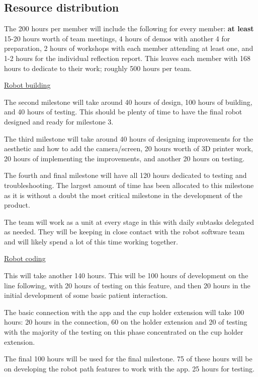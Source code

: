 \documentclass{article}
\begin{document}
\subsection{Resource distribution}

The 200 hours per member will include the following for every member: {\bf at least} 15-20 hours worth of team meetings, 4 hours of demos with another 4 for preparation, 2 hours of workshops with each member attending at least one, and 1-2 hours for the individual reflection report. This leaves each member with 168 hours to dedicate to their work; roughly 500 hours per team.


\underline{Robot building} 



The second milestone will take around 40 hours of design, 100 hours of building, and 40 hours of testing. This should be plenty of time to have the final robot designed and ready for milestone 3.

The third milestone will take around 40 hours of designing improvements for the aesthetic and how to add the camera/screen, 20 hours worth of 3D printer work, 20 hours of implementing the improvements, and another 20 hours on testing.

The fourth and final milestone will have all 120 hours dedicated to testing and troubleshooting. The largest amount of time has been allocated to this milestone as it is without a doubt the most critical milestone in the development of the product.

The team will work as a unit at every stage in this with daily subtasks delegated as needed. They will be keeping in close contact with the robot software team and will likely spend a lot of this time working together.

\underline{Robot coding}



This will take another 140 hours. This will be 100 hours of development on the line following, with 20 hours of testing on this feature, and then 20 hours in the initial development of some basic patient interaction.

The basic connection with the app and the cup holder extension will take 100 hours: 20 hours in the connection, 60 on the holder extension and 20 of testing with the majority of the testing on this phase concentrated on the cup holder extension.

The final 100 hours will be used for the final milestone. 75 of these hours will be on developing the robot path features to work with the app. 25 hours for testing.
\end{document}
